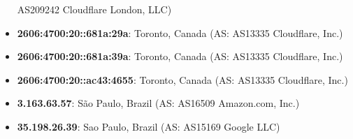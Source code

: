 \begin{itemize}
AS209242 Cloudflare London, LLC)\item \textbf{2606:4700:20::681a:29a}: Toronto, Canada (AS: AS13335 Cloudflare, Inc.)\item \textbf{2606:4700:20::681a:39a}: Toronto, Canada (AS: AS13335 Cloudflare, Inc.)\item \textbf{2606:4700:20::ac43:4655}: Toronto, Canada (AS: AS13335 Cloudflare, Inc.)\item \textbf{3.163.63.57}: São Paulo, Brazil (AS: AS16509 Amazon.com, Inc.)\item \textbf{35.198.26.39}: Sao Paulo, Brazil (AS: AS15169 Google LLC)
\end{itemize}
